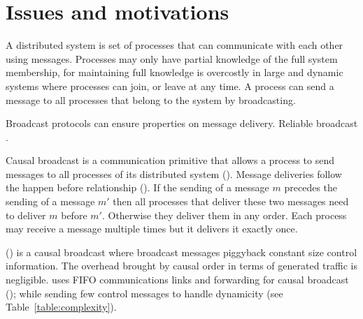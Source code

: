 
\section{Issues and motivations}
\label{sec:motivations}

A distributed system is set of processes that can communicate with each other
using messages. Processes may only have partial knowledge of the full system
membership, for maintaining full knowledge is overcostly in large and dynamic
systems where processes can join, or leave at any time. A process can send a
message to all processes that belong to the system by broadcasting.

Broadcast protocols can ensure properties on message delivery. Reliable
broadcast .

Causal broadcast is a communication primitive that allows a process to send
messages to all processes of its distributed system (\REF). Message deliveries
follow the happen before relationship (\REF). If the sending of a message $m$
precedes the sending of a message $m'$ then all processes that deliver these two
messages need to deliver $m$ before $m'$. Otherwise they deliver them in any
order. Each process may receive a message multiple times but it delivers it
exactly once.

\PCBROADCAST (\REF) is a causal broadcast where broadcast messages piggyback
constant size control information. The overhead brought by causal order in terms
of generated traffic is negligible.  \PCBROADCAST uses FIFO communications links
and forwarding for causal broadcast (\REF); while sending few control messages
to handle dynamicity (see Table~\ref{table:complexity}).

